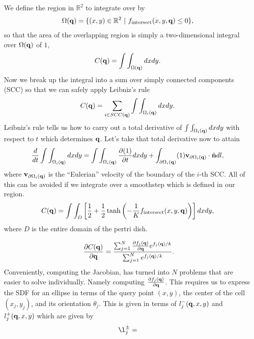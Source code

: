 We define the region in $\mathbb{R}^2$ to integrate over by 
\begin{equation}
    \Omega(\vb{q}) = \{ (x,y) \in \mathbb{R}^2 \ | \ f_{\textrm{intersect}}(x,y,\vb{q}) \leq 0 \},
\end{equation}
so that the area of the overlapping region is simply a two-dimensional integral over $\Omega(\vb{q})$ of $1$,
\begin{equation}
    C(\vb{q}) = \int\int_{\Omega(\vb{q})} dxdy.
\end{equation}
Now we break up the integral into a sum over simply connected components (SCC) so that we can safely apply Leibniz's rule
\begin{equation}
    C(\vb{q}) = \sum_{i \in SCC(\vb{q})}\int\int_{\Omega_i(\vb{q})} dxdy.
\end{equation}
Leibniz's rule tells us how to carry out a total derivative of $\int\int_{\Omega_i(\vb{q})} dxdy$ with respect to $t$ which determines $\vb{q}$. Let's take that total
derivative now to attain
\begin{equation}
   \frac{d}{dt}\int\int_{\Omega_i(\vb{q})} dxdy = \int\int_{\Omega_i(\vb{q})} \pdv{(1)}{t} dxdy + 
   \int_{\partial \Omega_i(\vb{q})} (1) \vb{v}_{\partial \Omega_i(\vb{q})} \cdot \hat{\vb{n}} dl,
\end{equation}
where $\vb{v}_{\partial \Omega_i(\vb{q})}$ is the ``Eulerian'' velocity of the boundary of the $i$-th SCC. All of this can be avoided if we integrate over a smoothstep
which is defined in our region.
\begin{equation}
    C(\vb{q}) = \int\int_{D} \left[ \frac{1}{2} +\frac{1}{2} \tanh{ \left(- \frac{1}{K}f_{\textrm{intersect}}(x,y,\vb{q}) \right)}\right]dxdy,
\end{equation}
where $D$ is the entire domain of the pertri dish.


\begin{equation*}\
\pdv{C(\vb{q})}{\vb{q}} = \frac{ \sum_{j=1}^N \pdv{f_j(\vb{q})}{\vb{q}}e^{f_j(\vb{q})/k}}{ \sum_{j=1}^N e^{f_j(\vb{q})/k}}.
\end{equation*}
Conveniently, computing the Jacobian, has turned into $N$ problems that are easier to solve individually. Namely computing $\pdv{f_j(\vb{q})}{\vb{q}}$.
This requires us to express the SDF for an ellipse in terms of the query point $(x,y)$, the center of the cell $(x_j,y_j)$, and its orientation $\theta_j$. This
is given in terms of $l_j^-(\vb{q}, x, y)$ and $l_j^+(\vb{q}, x, y)$ which are given by 
\begin{equation*}
\l_j^{\pm} = 
\end{equation*}

